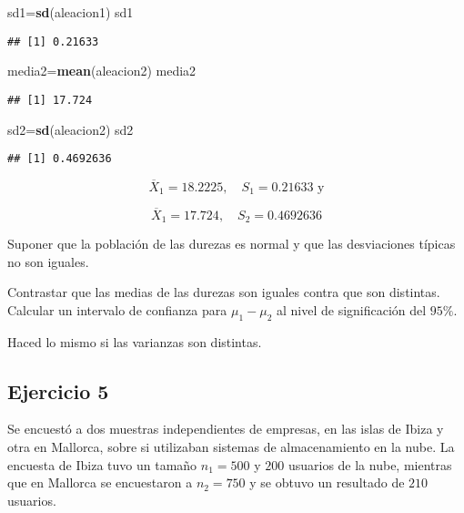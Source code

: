 \documentclass[
]{article}
\newenvironment{Shaded}{\begin{snugshade}}{\end{snugshade}}
\newcommand{\KeywordTok}[1]{\textcolor[rgb]{0.13,0.29,0.53}{\textbf{#1}}}
\newcommand{\NormalTok}[1]{#1}
\begin{document}
\begin{Shaded}
\begin{Highlighting}[]
\NormalTok{sd1=}\KeywordTok{sd}\NormalTok{(aleacion1)}
\NormalTok{sd1}
\end{Highlighting}
\end{Shaded}

\begin{verbatim}
## [1] 0.21633
\end{verbatim}

\begin{Shaded}
\begin{Highlighting}[]
\NormalTok{media2=}\KeywordTok{mean}\NormalTok{(aleacion2)}
\NormalTok{media2}
\end{Highlighting}
\end{Shaded}

\begin{verbatim}
## [1] 17.724
\end{verbatim}

\begin{Shaded}
\begin{Highlighting}[]
\NormalTok{sd2=}\KeywordTok{sd}\NormalTok{(aleacion2)}
\NormalTok{sd2}
\end{Highlighting}
\end{Shaded}

\begin{verbatim}
## [1] 0.4692636
\end{verbatim}

\[\overline{X}_{1}=18.2225,\quad S_{1}=0.21633 \mbox{ y}\]

\[\overline{X}_{1}=17.724,\quad S_{2}=0.4692636\]

Suponer que la población de las durezas es normal y que las desviaciones
típicas no son iguales.

Contrastar que las medias de las durezas son iguales contra que son
distintas. Calcular un intervalo de confianza para \(\mu_{1}-\mu_{2}\)
al nivel de significación del \(95\%\).

Haced lo mismo si las varianzas son distintas.

\hypertarget{ejercicio-5}{%
\subsection{Ejercicio 5}\label{ejercicio-5}}

Se encuestó a dos muestras independientes de empresas, en las islas de
Ibiza y otra en Mallorca, sobre si utilizaban sistemas de almacenamiento
en la nube. La encuesta de Ibiza tuvo un tamaño \(n_1=500\) y \(200\)
usuarios de la nube, mientras que en Mallorca se encuestaron a
\(n_2=750\) y se obtuvo un resultado de \(210\) usuarios.
\end{document}
